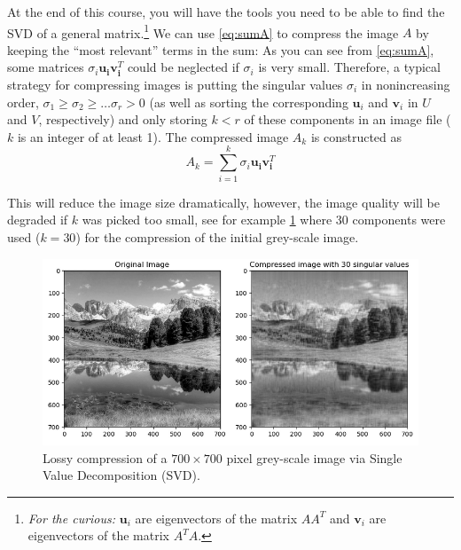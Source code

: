 \documentclass[10pt,addpoints]{exam} %
\begin{document}
\begin{questions}
    At the end of this course, you will have the tools you need to be able to find the SVD of a
    general matrix.\footnote{\textit{For the curious:} $\mathbf{u}_i$ are eigenvectors of the matrix
      $AA^T$ and $\mathbf{v}_i$ are eigenvectors of the matrix $A^TA$.}  We can use \cref{eq:sumA}
    to compress the image $A$ by keeping the ``most relevant'' terms in the sum: As you can see from
    \cref{eq:sumA}, some matrices $\sigma_i \mathbf{u}_{\mathbf{i}} \mathbf{v}_{\mathbf{i}}^T$ could
    be neglected if $\sigma_i$ is very small. Therefore, a typical strategy for compressing images
    is putting the singular values $\sigma_i$ in nonincreasing order,
    $\sigma_1 \geq \sigma_2 \geq \dots \sigma_r > 0$ (as well as sorting the corresponding
    $\mathbf{u}_i$ and $\mathbf{v}_i$ in $U$ and $V$, respectively) and only storing $k < r$ of
    these components in an image file ($k$ is an integer of at least 1). The compressed image $A_k$
    is constructed as
  \begin{equation}
    \label{eq:3}
    A_k=\sum_{i=1}^k \sigma_i \mathbf{u}_{\mathbf{i}} \mathbf{v}_{\mathbf{i}}^T
  \end{equation}
  
  This will reduce the image size dramatically, however, the image quality will
  be degraded if $k$ was picked too small, see for example
  \cref{fig:svd} where 30 components were used ($k = 30$) for the compression of
  the initial grey-scale image. 

  \begin{figure}[H]
    \centering
    \includegraphics[width=1.0\textwidth]{svd}
    \caption{Lossy compression of a $700\times 700$ pixel grey-scale image via
      Single Value Decomposition (SVD).}
    \label{fig:svd}
  \end{figure}
  
  \begin{parts}


\end{parts}
\end{questions}
\end{document}
